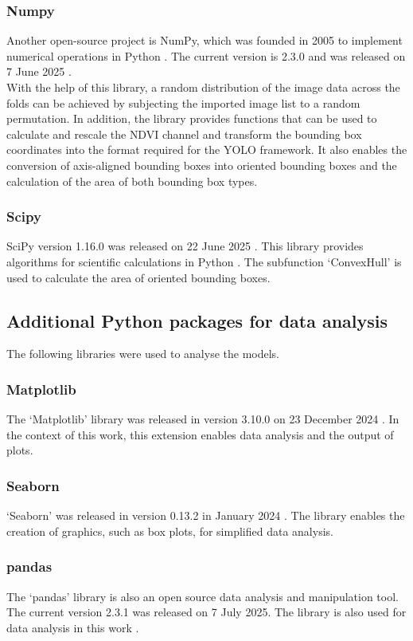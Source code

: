 \subsubsection{Numpy}
Another open-source project is NumPy, which was founded in 2005 to implement numerical operations in Python \cite{numpy_about}. The current version is 2.3.0 and was released on 7 June 2025 \cite{numpy_main_web}. \\
With the help of this library, a random distribution of the image data across the folds can be achieved by subjecting the imported image list to a random permutation. In addition, the library provides functions that can be used to calculate and rescale the \acrshort{NDVI} channel and transform the bounding box coordinates into the format required for the \acrshort{YOLO} framework. It also enables the conversion of axis-aligned bounding boxes into oriented bounding boxes and the calculation of the area of both bounding box types.
\subsubsection{Scipy}
SciPy version 1.16.0 was released on 22 June 2025 \cite{scipy-main}. This library provides algorithms for scientific calculations in Python \cite{scipy-main}. The subfunction ‘ConvexHull’ is used to calculate the area of oriented bounding boxes.
\subsection{Additional Python packages for data analysis}
The following libraries were used to analyse the models.
\subsubsection*{Matplotlib}
The ‘Matplotlib’ library was released in version 3.10.0 on 23 December 2024 \cite{matplotlib}. In the context of this work, this extension enables data analysis and the output of plots.
\subsubsection*{Seaborn}
‘Seaborn’ was released in version 0.13.2 in January 2024 \cite{seaborn}. The library enables the creation of graphics, such as box plots, for simplified data analysis.
\subsubsection*{pandas}
The ‘pandas’ library is also an open source data analysis and manipulation tool. The current version 2.3.1 was released on 7 July 2025. The library is also used for data analysis in this work \cite{pandas}.

